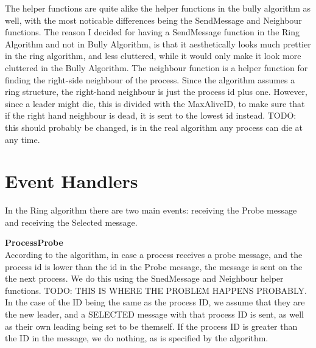 \documentclass{report}
\begin{document}
The helper functions are quite alike the helper functions in the bully algorithm as well, with the most noticable differences being the SendMessage and Neighbour functions.
The reason I decided for having a SendMessage function in the Ring Algorithm and not in Bully Algorithm, is that it aesthetically looks much prettier in the ring algorithm, and less cluttered, while it would only make it look more cluttered in the Bully Algorithm.
The neighbour function is a helper function for finding the right-side neighbour of the process. Since the algorithm assumes a ring structure, the right-hand neighbour is just the process id plus one. However, since a leader might die, this is divided with the MaxAliveID, to make sure that if the right hand neighbour is dead, it is sent to the lowest id instead. TODO: this should probably be changed, is in the real algorithm any process can die at any time.

\section{Event Handlers}
In the Ring algorithm there are two main events: receiving the Probe message and receiving the Selected message.

\noindent{}

\textbf{ProcessProbe}\\
According to the algorithm, in case a process receives a probe message, and the process id is lower than the id in the Probe message, the message is sent on the the next process. We do this using the SnedMessage and Neighbour helper functions. TODO: THIS IS WHERE THE PROBLEM HAPPENS PROBABLY. In the case of the ID being the same as the process ID, we assume that they are the new leader, and a SELECTED message with that process ID is sent, as well as their own leading being set to be themself. If the process ID is greater than the ID in the message, we do nothing, as is specified by the algorithm.
\end{document}
